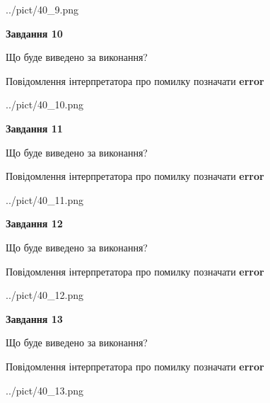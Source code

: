 \documentclass[11pt, ukrainian]{article}
\begin{document}
{\begin {large}
\begin{center}
	{../pict/40_9.png}
\end{center}
\newpage

{\begin {center}\textbf{Завдання 10}\end {center}}\par
Що буде виведено за виконання? \par
Повідомлення інтерпретатора про помилку позначати \textbf{error}

\begin{center}
	{../pict/40_10.png}
\end{center}
\newpage

{\begin {center}\textbf{Завдання 11}\end {center}}\par
Що буде виведено за виконання? \par
Повідомлення інтерпретатора про помилку позначати \textbf{error}

\begin{center}
	{../pict/40_11.png}
\end{center}
\newpage

{\begin {center}\textbf{Завдання 12}\end {center}}\par
Що буде виведено за виконання? \par
Повідомлення інтерпретатора про помилку позначати \textbf{error}

\begin{center}
	{../pict/40_12.png}
\end{center}
\newpage

{\begin {center}\textbf{Завдання 13}\end {center}}\par
Що буде виведено за виконання? \par
Повідомлення інтерпретатора про помилку позначати \textbf{error}

\begin{center}
	{../pict/40_13.png}
\end{center}
\newpage


\end{large}}
\end{document}
